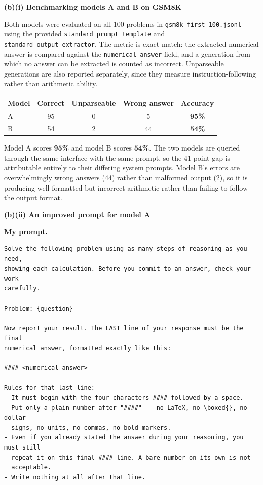 \begin{answer}

\textbf{(b)(i) Benchmarking models A and B on GSM8K}

Both models were evaluated on all 100 problems in \texttt{gsm8k\_first\_100.jsonl}
using the provided \texttt{standard\_prompt\_template} and
\texttt{standard\_output\_extractor}. The metric is exact match: the extracted
numerical answer is compared against the \texttt{numerical\_answer} field, and a
generation from which no answer can be extracted is counted as incorrect.
Unparseable generations are also reported separately, since they measure
instruction-following rather than arithmetic ability.

\begin{center}
\begin{tabular}{lcccc}
\toprule
Model & Correct & Unparseable & Wrong answer & Accuracy \\
\midrule
A & 95 & 0 & 5  & \textbf{95\%} \\
B & 54 & 2 & 44 & \textbf{54\%} \\
\bottomrule
\end{tabular}
\end{center}

Model A scores \textbf{95\%} and model B scores \textbf{54\%}. The two models are
queried through the same interface with the same prompt, so the 41-point gap is
attributable entirely to their differing system prompts. Model B's errors are
overwhelmingly wrong answers (44) rather than malformed output (2), so it is
producing well-formatted but incorrect arithmetic rather than failing to follow
the output format.

\vspace{1em}
\textbf{(b)(ii) An improved prompt for model A}

\textbf{My prompt.}

\begin{lstlisting}[language={},numbers=none,basicstyle=\footnotesize\ttfamily,frame=single]
Solve the following problem using as many steps of reasoning as you need,
showing each calculation. Before you commit to an answer, check your work
carefully.

Problem: {question}

Now report your result. The LAST line of your response must be the final
numerical answer, formatted exactly like this:

#### <numerical_answer>

Rules for that last line:
- It must begin with the four characters #### followed by a space.
- Put only a plain number after "####" -- no LaTeX, no \boxed{}, no dollar
  signs, no units, no commas, no bold markers.
- Even if you already stated the answer during your reasoning, you must still
  repeat it on this final #### line. A bare number on its own is not
  acceptable.
- Write nothing at all after that line.


\end{lstlisting}
\end{answer}
